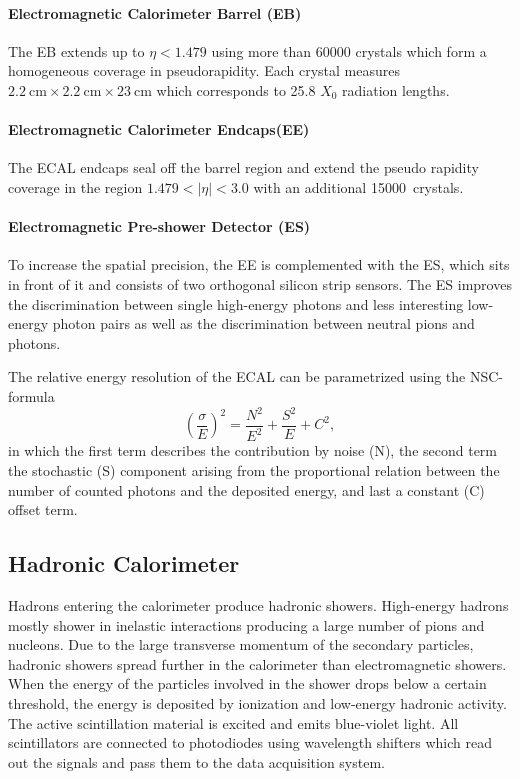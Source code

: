 \paragraph{Electromagnetic Calorimeter Barrel (EB)} 
The EB extends up to $\eta < 1.479$ using more than \num{60000} crystals which form a
homogeneous coverage in pseudorapidity. Each crystal measures
$\SI{2.2}{\centi\meter} \times \SI{2.2}{\centi\meter} \times
\SI{23}{\centi\meter}$ which corresponds to 25.8 $X_0$ radiation lengths.

\paragraph{Electromagnetic Calorimeter Endcaps(EE)} 
The ECAL endcaps seal off the barrel region and extend the pseudo rapidity
coverage in the region $1.479 < |\eta| < 3.0$ with an additional \SI{15000}
crystals.

\paragraph{Electromagnetic Pre-shower Detector (ES)} 
To increase the spatial precision, the EE is complemented with the ES, which sits
in front of it and consists of two orthogonal silicon strip sensors. The ES
improves the discrimination between single high-energy photons and less
interesting low-energy photon pairs as well as the discrimination between
neutral pions and photons.

The relative energy resolution of the ECAL can be parametrized using the NSC-formula
%
\begin{equation*}
    \left( \frac{\sigma}{E} \right)^2 = \frac{N^2}{E^2} + \frac{S^2}{E} + C^2,
\end{equation*}
%
in which the first term describes the contribution by noise (N), the second
term the stochastic (S) component arising from the proportional relation between
the number of counted photons and the deposited energy, and last a constant (C)
offset term.

\subsection{Hadronic Calorimeter}

Hadrons entering the calorimeter produce hadronic showers. High-energy
hadrons mostly shower in inelastic interactions producing a large number of pions
and nucleons. Due to the large transverse momentum of the secondary particles,
hadronic showers spread further in the calorimeter than electromagnetic showers.
When the energy of the particles involved in the shower drops below a certain
threshold, the energy is deposited by ionization and low-energy hadronic
activity. The active scintillation material is excited and emits blue-violet
light. All scintillators are connected to photodiodes using wavelength
shifters which read out the signals and pass them to the data acquisition system.

